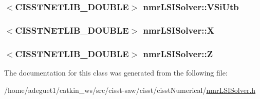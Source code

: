 \hypertarget{classnmr_l_s_i_solver_aacd1cede77ef83f0b256bdf0313c723a}{
\subsubsection[{V\-Si\-Utb}]{$<$C\-I\-S\-S\-T\-N\-E\-T\-L\-I\-B\-\_\-\-D\-O\-U\-B\-L\-E$>$ nmr\-L\-S\-I\-Solver\-::\-V\-Si\-Utb\hspace{0.3cm}{\ttfamily [protected]}}}\label{classnmr_l_s_i_solver_aacd1cede77ef83f0b256bdf0313c723a}
\hypertarget{classnmr_l_s_i_solver_ac38debb9bd9fe2ab5de72a8c43195de5}{
\subsubsection[{X}]{$<$C\-I\-S\-S\-T\-N\-E\-T\-L\-I\-B\-\_\-\-D\-O\-U\-B\-L\-E$>$ nmr\-L\-S\-I\-Solver\-::\-X\hspace{0.3cm}{\ttfamily [protected]}}}\label{classnmr_l_s_i_solver_ac38debb9bd9fe2ab5de72a8c43195de5}
\hypertarget{classnmr_l_s_i_solver_a4d7c8e1a6139189dc37329bfd6743ae6}{
\subsubsection[{Z}]{$<$C\-I\-S\-S\-T\-N\-E\-T\-L\-I\-B\-\_\-\-D\-O\-U\-B\-L\-E$>$ nmr\-L\-S\-I\-Solver\-::\-Z\hspace{0.3cm}{\ttfamily [protected]}}}\label{classnmr_l_s_i_solver_a4d7c8e1a6139189dc37329bfd6743ae6}


The documentation for this class was generated from the following file\-:\begin{DoxyCompactItemize}
\item 
/home/adeguet1/catkin\-\_\-ws/src/cisst-\/saw/cisst/cisst\-Numerical/\hyperlink{nmr_l_s_i_solver_8h}{nmr\-L\-S\-I\-Solver.\-h}\end{DoxyCompactItemize}
